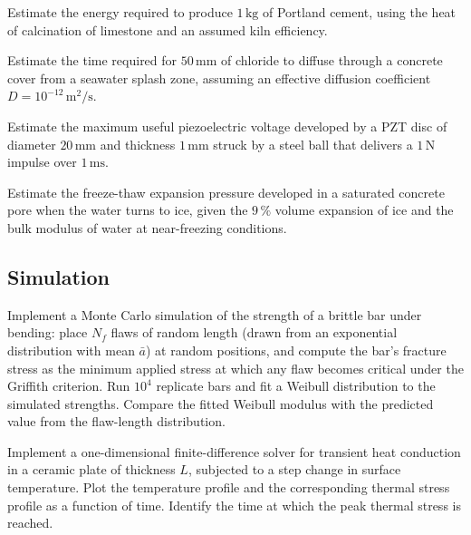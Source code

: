 \begin{exercise}
Estimate the energy required to produce $1\,\text{kg}$ of Portland
cement, using the heat of calcination of limestone and an assumed
kiln efficiency.
\end{exercise}

\begin{exercise}
Estimate the time required for $50\,\text{mm}$ of chloride to diffuse
through a concrete cover from a seawater splash zone, assuming an
effective diffusion coefficient $D = 10^{-12}\,\text{m}^2/\text{s}$.
\end{exercise}

\begin{exercise}
Estimate the maximum useful piezoelectric voltage developed by a PZT
disc of diameter $20\,\text{mm}$ and thickness $1\,\text{mm}$ struck by
a steel ball that delivers a $1\,\text{N}$ impulse over $1\,\text{ms}$.
\end{exercise}

\begin{exercise}
Estimate the freeze-thaw expansion pressure developed in a saturated
concrete pore when the water turns to ice, given the $9\,\%$ volume
expansion of ice and the bulk modulus of water at near-freezing
conditions.
\end{exercise}

\subsection*{Simulation}

\begin{exercise}
Implement a Monte Carlo simulation of the strength of a brittle bar
under bending: place $N_f$ flaws of random length (drawn from an
exponential distribution with mean $\bar{a}$) at random positions, and
compute the bar's fracture stress as the minimum applied stress at
which any flaw becomes critical under the Griffith criterion. Run
$10^4$ replicate bars and fit a Weibull distribution to the simulated
strengths. Compare the fitted Weibull modulus with the predicted value
from the flaw-length distribution.
\end{exercise}

\begin{exercise}
Implement a one-dimensional finite-difference solver for transient
heat conduction in a ceramic plate of thickness $L$, subjected to a
step change in surface temperature. Plot the temperature profile and
the corresponding thermal stress profile as a function of time. Identify
the time at which the peak thermal stress is reached.
\end{exercise}

